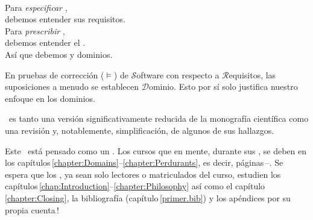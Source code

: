 \label{chap:Introduction}\label{chap:Introduction.1}
\minitoc

\begin{flushright}\label{intro:The Triptych Dogma}
\\[4mm]
\sf Para \textsl{especificar} ,\\
\sf debemos entender sus requisitos.\\[1mm]
\sf Para \textsl{prescribir} ,\\
\sf debemos entender el .\\[1mm]
\sf Así que debemos  y  dominios.\\
\end{flushright}\rm%
\mnewfoil

\noindent
\begynd
\pind En pruebas de corrección ($\models$) %
\begynd
\pind de $\mathcal{S}$oftware
\pind con respecto a $\mathcal{R}$equisitos,
\pind las suposiciones a menudo se establecen  $\mathcal{D}$ominio.
\afslut
\pind Esto por sí solo justifica nuestro enfoque en los dominios.
\afslut
\endboiteepaisseavecuntitre

\mnewfoil

\noindent
\begynd
\pind {} \manual\ es
\begynd
\pind tanto una versión significativamente reducida \nyl de la monografía científica \cite{BjornerMonograph2020} 
\pind como una revisión y, notablemente, simplificación, de algunos de sus hallazgos.
\afslut
\afslut

\label{sec:Why This Primer}

\begynd
\pind Este \manual\ está pensado como un .
\pind Los cursos que  en mente, durante sus , se deben  en los
      capítulos\,\ref{chapter:Domains}--\ref{chapter:Perdurants},
      es decir, páginas\,\pageref{chapter:Domains}--\pageref{chapter:Perdurants.n}.
\pind Se espera que los , ya sean solo lectores o matriculados del curso, estudien
      los capítulos\,\ref{chap:Introduction}--\ref{chapter:Philosophy} así
      como el capítulo\,\ref{chapter:Closing}, la bibliografía
      (capítulo\,\ref{primer.bib}) y los apéndices por su propia cuenta\,!
\afslut

